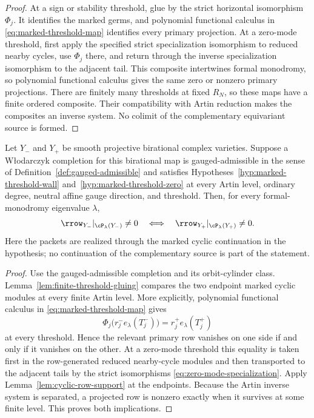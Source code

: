 \begin{proof}
At a sign or stability threshold, glue by the strict horizontal isomorphism
\(\Phi_j\).  It identifies the marked germs, and polynomial functional
calculus in \eqref{eq:marked-threshold-map} identifies every primary
projection.  At a zero-mode threshold, first apply the specified
strict specialization isomorphism to reduced nearby cycles, use \(\Phi_j\)
there, and return through the inverse specialization isomorphism to the
adjacent tail.  This composite intertwines formal monodromy, so polynomial
functional calculus gives the same zero or nonzero primary projections.
There are finitely many thresholds at fixed
\(R_N\), so these maps have a finite ordered composite.  Their compatibility
with Artin reduction makes the composites an inverse system.  No colimit of
the complementary equivariant source is formed.
\end{proof}

\begin{theorem}
\label{thm:birational-point-primary}
Let \(Y_-\) and \(Y_+\) be smooth projective birational complex varieties.
Suppose a W{\l}odarczyk completion for this birational map is
gauged-admissible in the sense of Definition~\ref{def:gauged-admissible} and
satisfies Hypotheses~\ref{hyp:marked-threshold-wall}
and~\ref{hyp:marked-threshold-zero} at every Artin level,
ordinary degree, neutral affine gauge direction, and threshold.
Then, for every formal-monodromy eigenvalue
\(\lambda\),
\begin{equation}\label{eq:point-row-primary-boolean}
 \rrow_{Y_-}|_{\cP_\lambda(Y_-)}\ne0
 \quad\Longleftrightarrow\quad
 \rrow_{Y_+}|_{\cP_\lambda(Y_+)}\ne0.
\end{equation}
Here the packets are realized through the marked cyclic continuation in the
hypothesis; no continuation of the complementary source is part of the
statement.
\end{theorem}

\begin{proof}
Use the gauged-admissible completion and its orbit-cylinder class.
Lemma~\ref{lem:finite-threshold-gluing} compares the two endpoint marked
cyclic modules at every finite Artin level.  More explicitly,
polynomial functional calculus in \eqref{eq:marked-threshold-map} gives
\[
 \Phi_j\bigl(r_j^-e_\lambda(T_j^-)\bigr)
   =r_j^+e_\lambda(T_j^+)
\]
at every threshold.  Hence the relevant primary row vanishes on one side if
and only if it vanishes on the other.  At a zero-mode threshold this equality
is taken first in the row-generated reduced nearby-cycle modules and then
transported to the adjacent tails by the strict isomorphisms
\eqref{eq:zero-mode-specialization}.  Apply
Lemma~\ref{lem:cyclic-row-support} at the endpoints.
Because the Artin inverse system is separated, a projected row is nonzero
exactly when it survives at some finite level.  This proves both implications.
\end{proof}

